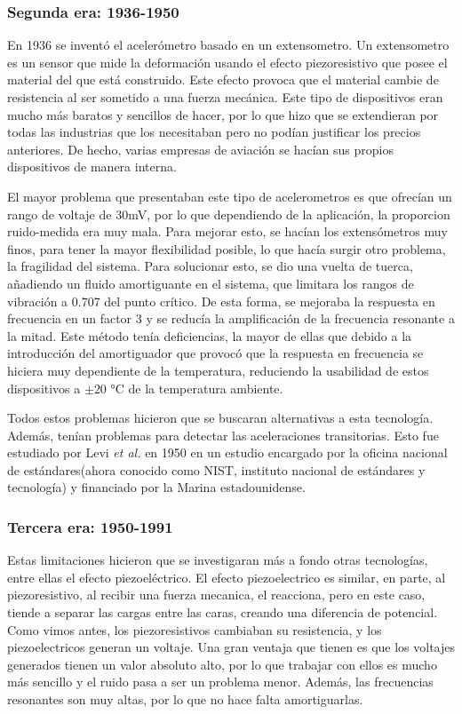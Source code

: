 \documentclass[12pt]{article}
\numberwithin{equation}{section}
\begin{document}
\subsubsection{Segunda era: 1936-1950}
En 1936\cite{50yearsof} se inventó el acelerómetro basado en un extensometro. Un extensometro es un sensor que mide la deformación usando el efecto piezoresistivo que posee el material del que está construido. Este efecto provoca que el material cambie de resistencia al ser sometido a una fuerza mecánica. Este tipo de dispositivos eran mucho más baratos y sencillos de hacer, por lo que hizo que se extendieran por todas las industrias que los necesitaban pero no podían justificar los precios anteriores. De hecho, varias empresas de aviación se hacían sus propios dispositivos de manera interna.

El mayor problema que presentaban este tipo de acelerometros es que ofrecían un rango de voltaje de 30mV, por lo que dependiendo de la aplicación, la proporcion ruido-medida era muy mala. Para mejorar esto, se hacían los extensómetros muy finos, para tener la mayor flexibilidad posible, lo que hacía surgir otro problema, la fragilidad del sistema. Para solucionar esto, se dio una vuelta de tuerca, añadiendo un fluido amortiguante en el sistema, que limitara los rangos de vibración a 0.707 del punto crítico. De esta forma, se mejoraba la respuesta en frecuencia en un factor 3 y se reducía la amplificación de la frecuencia resonante a la mitad. Este método tenía deficiencias, la mayor de ellas que debido a la introducción del amortiguador que provocó que la respuesta en frecuencia se hiciera muy dependiente de la temperatura, reduciendo la usabilidad de estos dispositivos a $\pm 20$ °C de la temperatura ambiente.

Todos estos problemas hicieron que se buscaran alternativas a esta tecnología. Además, tenían problemas para detectar las aceleraciones transitorias. Esto fue estudiado por Levi \textit{et al.}\cite{levy} en 1950 en un estudio encargado por la oficina nacional de estándares(ahora conocido como NIST, instituto nacional de estándares y tecnología) y financiado por la Marina estadounidense. 

\subsubsection{Tercera era: 1950-1991}

Estas limitaciones hicieron que se investigaran más a fondo otras tecnologías, entre ellas el efecto piezoeléctrico. El efecto piezoelectrico es similar, en parte, al piezoresistivo, al recibir una fuerza mecanica, el reacciona, pero  en este caso, tiende a separar las cargas entre las caras, creando una diferencia de potencial. Como vimos antes, los piezoresistivos cambiaban  su resistencia, y los piezoelectricos generan un voltaje. Una gran ventaja que tienen es que los voltajes generados tienen un valor absoluto alto, por lo que trabajar con ellos es mucho más sencillo y el ruido pasa a ser un problema menor. Además, las frecuencias resonantes son muy altas, por lo que no hace falta amortiguarlas.
\end{document}

